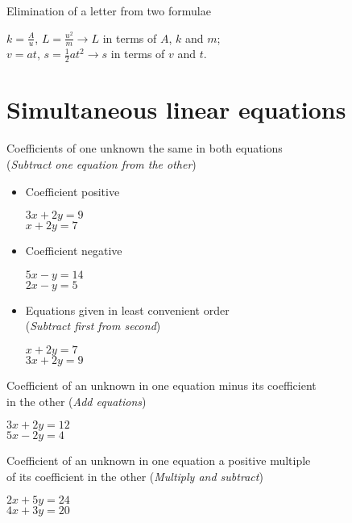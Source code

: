 \documentclass{article}
\begin{document}
Elimination of a letter from two formulae
\vspace{-1.2cm}
\begin{flushright}
\(k = \frac{A}{u}\), \(L = \frac{u^2}{m} \rightarrow L\) in terms of \(A\), \(k\) and \(m\); \\
\(v = at\), \(s = \frac{1}{2}at^2 \rightarrow s\) in terms of \(v\) and \(t\).
\end{flushright}

\section{Simultaneous linear equations}

Coefficients of one unknown the same in both equations\\
(\textit{Subtract one equation from the other})

\begin{itemize}
\item Coefficient positive
\vspace{-1cm}
\begin{flushright}
\(3x + 2y = 9\)\\
\(x+2y = 7\)
\end{flushright}

\item Coefficient negative
\vspace{-1cm}
\begin{flushright}
\(5x-y = 14\) \\
\(2x - y = 5\)
\end{flushright}

\item Equations given in least convenient order \\
(\textit{Subtract first from second})
\vspace{-1cm}
\begin{flushright}
\(x+2y = 7\) \\
\(3x + 2y = 9\)
\end{flushright}
\end{itemize}

Coefficient of an unknown in one equation minus its coefficient\\
in the other (\textit{Add equations})
\vspace{-1.2cm}
\begin{flushright}
\(3x+2y = 12\) \\
\(5x - 2y = 4\)
\end{flushright}

Coefficient of an unknown in one equation a positive multiple \\
of its coefficient in the other (\textit{Multiply and subtract})
\vspace{-1.2cm}
\begin{flushright}
\(2x + 5y = 24\) \\
\(4x + 3y = 20\)
\end{flushright}
\end{document}
